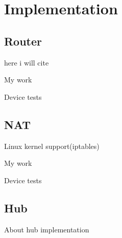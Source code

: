 \chapter{Implementation}
\label{chapter:impl}

\section{Router}
\label{sub-sec:router-impl}

here i will cite \cite{netlinksockets}

My work

Device tests

\lstset{language=C, caption=Add bridge}


\section{NAT}
\label{sub-sec:nat-impl}

Linux kernel support(iptables)

My work

Device tests

\section{Hub}
\label{sub-sec:hub:impl}

About hub implementation
